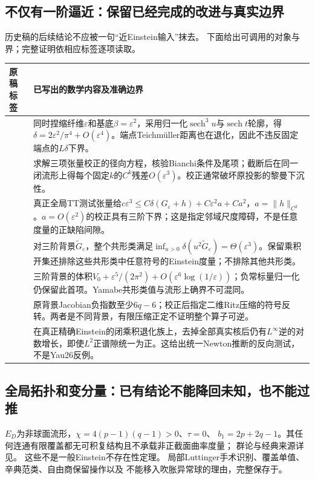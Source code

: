 \documentclass[UTF8,a4paper,11pt,fontset=fandol]{ctexart}
\numberwithin{equation}{section}
\theoremstyle{definition}
\begin{document}
\subsection{不仅有一阶逼近：保留已经完成的改进与真实边界}
历史稿的后续结论不应被一句“近Einstein输入”抹去。
下面给出可调用的对象与界；完整证明依相应标签逐项读取。
\begin{longtable}{L{.23\textwidth}L{.65\textwidth}}
\toprule 原稿标签 & 已写出的数学内容及准确边界\\\midrule\endhead
{} & 同时捏缩纤维$\varepsilon$和基底$\beta=\varepsilon^2$，采用归一化$\operatorname{sech}^3u$与$\operatorname{sech}t$轮廓，得$\delta=2\varepsilon^2/\pi^4+O(\varepsilon^4)$。端点Teichmüller距离也在退化，因此不违反固定端点的$L\delta$下界。\\
 & 求解三项张量校正的径向方程，核验Bianchi条件及尾项；截断后在同一闭流形上得每个固定$k$的$C^k$残差$O(\varepsilon^3)$。校正通常破坏原投影的黎曼下沉性。\\
 & 真正全局TT测试张量给$c\varepsilon^3\le C\delta(G_\varepsilon+h)+C\varepsilon^2a+Ca^2$，$a=\|h\|_{C^2}$。$a=O(\varepsilon^2)$的校正具有三阶下界；这是指定邻域尺度障碍，不是任意度量的正缺陷间隙。\\
 & 对三阶背景$\widetilde G_\varepsilon$，整个共形类满足$\inf_{u>0}\delta(u^2\widetilde G_\varepsilon)=\Theta(\varepsilon^3)$。保留乘积开集还排除这些共形类中任意符号的Einstein度量；不排除其他共形类。\\
 & 三阶背景的体积$V_0+\varepsilon^5/(2\pi^2)+O(\varepsilon^6\log(1/\varepsilon))$；负常标量归一化仍保留此首项。Yamabe共形类值与流形上确界不可混同。\\
 & 原背景Jacobian负指数至少$6q-6$；校正后指定二维Ritz压缩的符号反转。两者是不同背景，有限压缩正定不证明整个算子可逆。\\
 & 在真正精确Einstein的闭乘积退化族上，去掉全部真实核后仍有$L^\infty$逆的对数增长，即使$L^2$正谱隙统一为正。这给出统一Newton推断的反向测试，不是Yau26反例。\\\bottomrule
\end{longtable}

\subsection{全局拓扑和变分量：已有结论不能降回未知，也不能过推}
$E_D$为非球面流形，$\chi=4(p-1)(q-1)>0$、$\tau=0$、
$b_1=2p+2q-1$。其任何连通有限覆盖都无可积复结构且不承载非正截面曲率度量；
群论与经典来源详见。
这些不是一般Einstein不存在性定理。
局部Luttinger手术识别、覆盖单值、辛典范类、自由商保留操作以及
不能移入吹胀异常球的理由，完整保存于。
\end{document}
